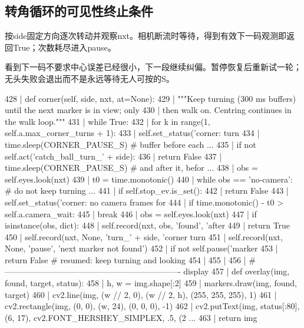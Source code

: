 \subsection{转角循环的可见性终止条件}
按side固定方向逐次转动并观察nxt。相机断流时等待，得到有效下一码观测即返回True；次数耗尽进入pause。

看到下一码不要求中心误差已经很小，下一段继续纠偏。暂停恢复后重新试一轮；无头失败会退出而不是永远等待无人可按的S。
\begin{CodeBlock}
 428 |     def corner(self, side, nxt, at=None):
 429 |         """Keep turning (300 ms buffers) until the next marker is in view; only
 430 |         then walk on. Centring continues in the walk loop."""
 431 |         while True:
 432 |             for k in range(1, self.a.max_corner_turns + 1):
 433 |                 self.set_status('corner: turn %
 434 |                 time.sleep(CORNER_PAUSE_S)            # buffer before each  ...
 435 |                 if not self.act('catch_ball_turn_' + side):
 436 |                     return False
 437 |                 time.sleep(CORNER_PAUSE_S)            # and after it, befor ...
 438 |                 obs = self.eyes.look(nxt)
 439 |                 t0 = time.monotonic()
 440 |                 while obs == 'no-camera':             # do not keep turning ...
 441 |                     if self.stop_ev.is_set():
 442 |                         return False
 443 |                     self.set_status('corner: no camera frames for %
 444 |                     if time.monotonic() - t0 > self.a.camera_wait:
 445 |                         break
 446 |                     obs = self.eyes.look(nxt)
 447 |                 if isinstance(obs, dict):
 448 |                     self.record(nxt, obs, 'found', 'after %
 449 |                     return True
 450 |                 self.record(nxt, None, 'turn_' + side, 'corner turn %
 451 |             self.record(nxt, None, 'pause', 'next marker not found')
 452 |             if not self.pause('marker %
 453 |                 return False      # resumed: keep turning and looking
 454 | 
 455 | 
 456 | # ---------------------------------------------------------------- display
 457 | def overlay(img, found, target, status):
 458 |     h, w = img.shape[:2]
 459 |     markers.draw(img, found, target)
 460 |     cv2.line(img, (w // 2, 0), (w // 2, h), (255, 255, 255), 1)
 461 |     cv2.rectangle(img, (0, 0), (w, 24), (0, 0, 0), -1)
 462 |     cv2.putText(img, status[:80], (6, 17), cv2.FONT_HERSHEY_SIMPLEX, .5, (2 ...
 463 |     return img
\end{CodeBlock}

